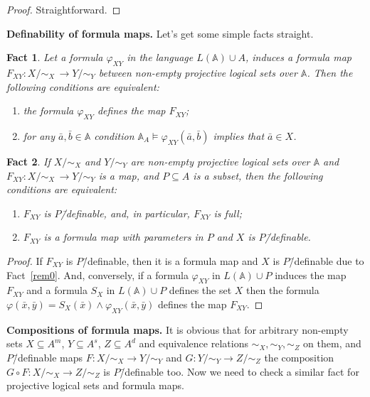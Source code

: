 \documentclass[12pt]{article}
\newtheorem{fact}{Fact}
\theoremstyle{definition}
\def\MA{{\mathbb{A}}}
\begin{document}
\begin{proof}
Straightforward.
\end{proof}

{\bf Definability of formula maps.} 
Let's get some simple facts straight.

\begin{fact}\label{fact10}
Let a formula $\varphi_{XY}$ in the language $L(\MA)\cup A$,  induces a formula map $F_{XY}\colon X/{\sim_X} \,\to Y/{\sim_Y}$ between non-empty projective logical sets over $\MA$. Then the following conditions are equivalent:
\begin{enumerate}[label=\arabic*)]
\item the formula $\varphi_{XY}$ defines the map $F_{XY}$;
\item for any $\bar a, \bar b\in \MA$ condition 
$\MA_A\models\varphi_{XY}(\bar a,\bar b)$ implies that $\bar a\in X$.
\end{enumerate}
\end{fact}

\begin{fact}\label{rem5}
If $X/{\sim_X}$ and $Y/{\sim_Y}$ are non-empty projective logical sets over $\MA$ and $F_{XY}\colon X/{\sim_X} \,\to Y/{\sim_Y}$ is a map, and $P\subseteq A$ is a subset, then the following conditions are equivalent:
\begin{enumerate}[label=\arabic*)]
\item $F_{XY}$ is $P$\=/definable, and, in particular, $F_{XY}$ is full;
\item $F_{XY}$ is a formula map with parameters in $P$ and $X$ is $P$\=/definable.
\end{enumerate}
\end{fact}

\begin{proof}
If $F_{XY}$ is $P$\=/definable, then it is a formula map and $X$ is $P$\=/definable due to Fact~\ref{rem0}. And, conversely, if a formula $\varphi_{XY}$ in $L(\MA)\cup P$ induces the map $F_{XY}$ and a formula $S_X$ in $L(\MA)\cup P$ defines the set $X$ then the formula $\varphi(\bar x,\bar y)=S_X(\bar x)\wedge \varphi_{XY}(\bar x,\bar y)$ defines the map $F_{XY}$.
\end{proof}

{\bf Compositions of formula maps.} 
It is obvious that for arbitrary non-empty sets $X\subseteq A^m$, $Y\subseteq A^s$, $Z\subseteq A^d$ and equivalence relations $\sim_X,\sim_Y,\sim_Z$ on them, and $P$\=/definable maps $F\colon X/{\sim_X}\to Y/{\sim_Y}$ and $G\colon Y/{\sim_Y}\to Z/{\sim_Z}$ the composition $G\circ F\colon X/{\sim_X}\to Z/{\sim_Z}$ is $P$\=/definable too. Now we need to check a similar fact for projective logical sets and formula maps.
\end{document}

